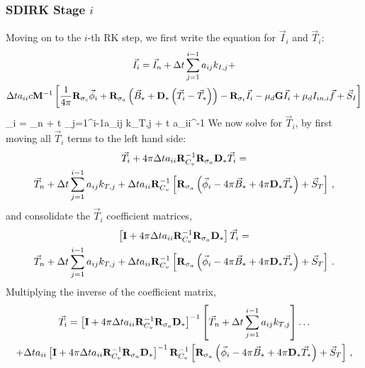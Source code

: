 \subsubsection{SDIRK Stage $i$}
Moving on to the $i$-th RK step, we first write the equation for $\vec{I}_i$ and $\vec{T}_{i}$:
\begin{multline}
\vec{I}_i = \vec{I}_n + \Delta t \sum_{j=1}^{i-1}{a_{ij} k_{I,j}   } + \\
\Delta t a_{ii} c  \mathbf M^{-1}\left[ \frac{1}{4\pi}\mathbf{R}_{\sigma_s}\vec{\phi}_i +
\mathbf{R}_{\sigma_a}\left(\vec{B}_* +  \mathbf{D}_*  \left(\vec{T}_i -\vec{T}_*  \right)   \right)- \mathbf{R}_{\sigma_t} \vec{I}_i - \mu_d \mathbf{G}\vec{I}_i + \mu_d I_{in,i} \vec{f}+ \vec{S}_I
\right]
\label{eq:first_kIi}
\end{multline}
\benum
{}_i = _n + \Delta t \sum_{j=1}^{i-1}{a_{ij} k_{T,j}   } + \Delta t a_{ii}^{-1} \pep
\label{eq:first_kTi}
\eenum
%
%
We now solve  for $\vec{T}_{i}$, by first moving all $\vec{T}_i$ terms to the left hand side: 
%
%
\begin{multline}
\vec{T}_i +4\pi\Delta t a_{ii}\mathbf{R}_{C_v}^{-1}\mathbf{R}_{\sigma_a} \mathbf{D}_* \vec{T}_i = \\
\vec{T}_n + \Delta t \sum_{j=1}^{i-1}{a_{ij} k_{T,j}   } + \Delta t a_{ii}
\mathbf{R}_{C_v}^{-1}\left[
\mathbf{R}_{\sigma_a} \left(\vec{\phi}_i - 4\pi\vec{B}_* + 4\pi \mathbf{D}_* \vec{T}_* \right) + \vec{S}_T
 \right] \, ,
\end{multline}
%
%
and consolidate the $\vec{T}_i$ coefficient matrices,
\begin{multline}
\left[ \mathbf{I}  + 4\pi\Delta t a_{ii}\mathbf{R}_{C_v}^{-1}\mathbf{R}_{\sigma_a} \mathbf{D}_*   \right]\vec{T}_i = \\
\vec{T}_n + \Delta t \sum_{j=1}^{i-1}{a_{ij} k_{T,j}   } + \Delta t a_{ii}\mathbf{R}_{C_v}^{-1}\left[\mathbf{R}_{\sigma_a} \left(\vec{\phi}_i - 4\pi\vec{B}_* + 4\pi \mathbf{D}_* \vec{T}_* \right) + \vec{S}_T \right] \, .
\end{multline}
%
Multiplying the inverse of the coefficient matrix,
%
\begin{multline}
\vec{T}_i = \left[ \mathbf{I} + 4\pi\Delta t a_{ii}\mathbf{R}_{C_v}^{-1}\mathbf{R}_{\sigma_a} \mathbf{D}_*   \right]^{-1}\left[\vec{T}_n + \Delta t \sum_{j=1}^{i-1}{a_{ij} k_{T,j}   }\right] \dots \\
+ \Delta t a_{ii}\left[ \mathbf{I} +  4\pi\Delta t a_{ii}\mathbf{R}_{C_v}^{-1}\mathbf{R}_{\sigma_a} \mathbf{D}_*   \right]^{-1}\mathbf{R}_{C_v}^{-1}\left[
\mathbf{R}_{\sigma_a} \left(\vec{\phi}_i - 4\pi\vec{B}_* + 4\pi \mathbf{D}_* \vec{T}_* \right) + \vec{S}_T 
\right] \, ,
\end{multline}
